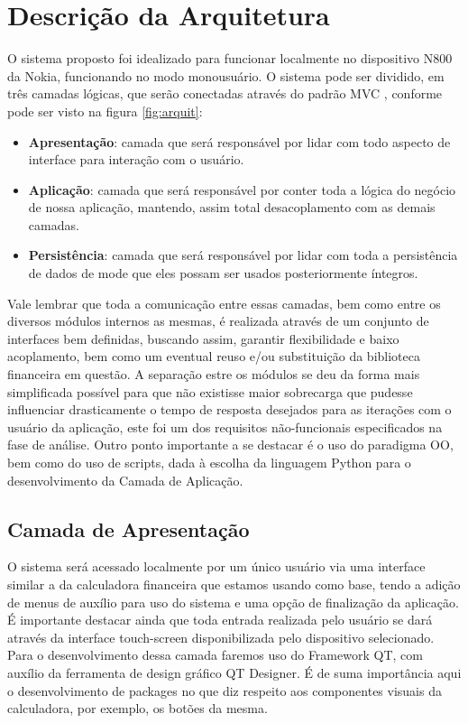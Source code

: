 \section{Descrição da Arquitetura}
O sistema proposto foi idealizado para funcionar localmente no dispositivo N800 da Nokia, funcionando no modo monousuário. O sistema pode ser dividido, em três camadas lógicas, que serão conectadas através do padrão MVC \cite{mvc}, conforme pode ser visto na figura \ref{fig:arquit}:
\begin{itemize}
 \item \textbf{Apresentação}: camada que será responsável por lidar com todo aspecto de interface para interação com o usuário.
 \item \textbf{Aplicação}: camada que será responsável por conter toda a lógica do negócio de nossa aplicação, mantendo, assim total desacoplamento com as demais camadas.
 \item \textbf{Persistência}: camada que será responsável por lidar com toda a persistência de dados de mode que eles possam ser usados posteriormente íntegros.
\end{itemize}
Vale lembrar que toda a comunicação entre essas camadas, bem como entre os diversos módulos internos as mesmas, é realizada através de um conjunto de interfaces bem definidas, buscando assim, garantir flexibilidade e baixo acoplamento, bem como um eventual reuso e/ou substituição da biblioteca financeira em questão. A separação estre os módulos se deu da forma mais simplificada possível para que não existisse maior sobrecarga que pudesse influenciar drasticamente o tempo de resposta desejados para as iterações com o usuário da aplicação, este foi um dos requisitos não-funcionais especificados na fase de análise.
Outro ponto importante a se destacar é o uso do paradigma OO, bem como do uso de scripts, dada à escolha da linguagem Python para o desenvolvimento da Camada de Aplicação.

\subsection{Camada de Apresentação}
O sistema será acessado localmente por um único usuário via uma interface similar a da calculadora financeira que estamos usando como base, tendo a adição de menus de auxílio para uso do sistema e uma opção de finalização da aplicação. É importante destacar ainda que toda entrada realizada pelo usuário se dará através da interface touch-screen disponibilizada pelo dispositivo selecionado.
Para o desenvolvimento dessa camada faremos uso do Framework QT, com auxílio da ferramenta de design gráfico QT Designer. É de suma importância aqui o desenvolvimento de packages no que diz respeito aos componentes visuais da calculadora, por exemplo, os botões da mesma.


